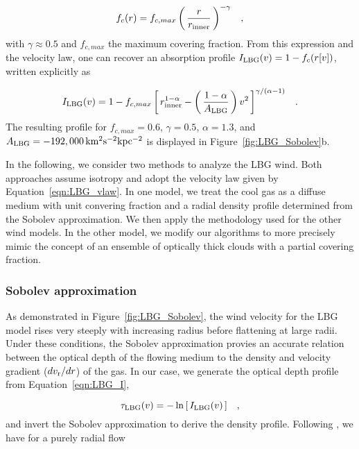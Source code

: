 \documentclass[12pt,preprint]{aastex}
\begin{document}
\begin{equation}
f_c(r) = f_{c,max} \left ( \, \frac{r}{r_{\rm inner}} \, \right )^{-\gamma} \;\;\; ,
\label{eqn:covering}
\end{equation}
with $\gamma \approx 0.5$ and $f_{c,max}$ the maximum covering
fraction.  From this expression and the velocity law, one can recover
an absorption profile $I_{\rm LBG}(v) = 1 - f_c(r[v])$, written
explicitly as

\begin{equation}
I_{\rm LBG}(v) = 1 - f_{c,max} \left [ \, r_{\rm inner}^{1-\alpha} - \left ( \,
\frac{1-\alpha}{A_{\rm LBG}} \, \right ) v^2 \, \right ]^{\gamma/(\alpha-1)}
\;\;\; .
\label{eqn:LBG_I}
\end{equation}
The resulting profile for $f_{c,max} = 0.6$, $\gamma=0.5$,
$\alpha=1.3$, and $A_{\rm LBG} = -192,000 \, \rm km^2 s^{-2} kpc^{-2}$ 
is displayed in Figure~\ref{fig:LBG_Sobolev}b.  

In the following, we consider two methods to analyze the LBG wind.
Both approaches assume isotropy and adopt the velocity law given by
Equation~\ref{eqn:LBG_vlaw}.  In one model, we treat the cool gas as a
diffuse medium with unit convering fraction and a radial density
profile determined from the Sobolev approximation.  We then apply 
the methodology used for the other wind models.  In the other model,
we modify our algorithms to more precisely mimic the concept of an
ensemble of optically thick clouds with a partial covering fraction.

\subsubsection{Sobolev approximation}
\label{sec:Sobolev}

As demonstrated in Figure~\ref{fig:LBG_Sobolev}, the wind velocity for
the LBG model rises very steeply with increasing radius before
flattening at large radii.  Under these conditions, the Sobolev
approximation provies an accurate relation between the optical depth
of the flowing medium to the
density and velocity gradient ($dv_{\rm r}/dr$) of the gas.  In our case, we 
generate the optical depth profile from Equation~\ref{eqn:LBG_I}, 

\begin{equation}
\tau_{\rm LBG}(v) = -\ln \left [ \, I_{\rm LBG}(v) \, \right ] \;\;\; ,
\label{eqn:tauLBG}
\end{equation}
and invert the Sobolev approximation to derive the density profile.
Following \cite{lamers+c99}, we have for a purely radial flow
\end{document}
